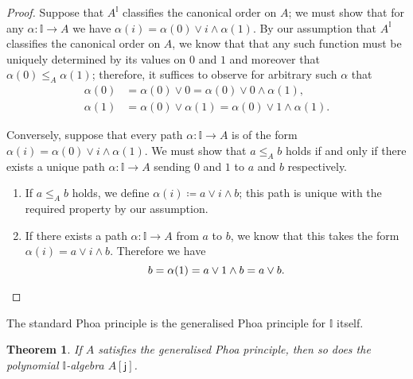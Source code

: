 \documentclass[a4paper,12pt]{amsart}
\newtheorem{theorem}{Theorem}[section]
\theoremstyle{definition}
\newcommand{\mbb}[1]{\mathbb{#1}}
\newcommand{\I}{\mbb I}
\newcommand{\ms}[1]{\mathsf{#1}}
\begin{document}
\begin{proof}
  Suppose that $A^\I$ classifies the canonical order on $A$; we must show that for any $\alpha\colon \I\to A$ we have $\alpha(i) = \alpha(0)\vee i \wedge \alpha(1)$. By our assumption that $A^\I$ classifies the canonical order on $A$, we know that that any such function must be uniquely determined by its values on $0$ and $1$ and moreover that $\alpha(0) \le_A \alpha(1)$; therefore, it suffices to observe for arbitrary such $\alpha$ that
  \begin{align*}
    \alpha(0) &= \alpha(0) \vee 0 = \alpha(0)\vee 0 \wedge \alpha(1)\text{,}\\
    \alpha(1) &= \alpha(0)\vee\alpha(1) = \alpha(0)\vee 1 \wedge \alpha(1)\text{.}
  \end{align*}

  Conversely, suppose that every path $\alpha\colon \I\to A$ is of the form $\alpha(i) = \alpha(0)\vee i \wedge \alpha(1)$. We must show that $a\le_A b$ holds if and only if there exists a unique path $\alpha\colon \I\to A$ sending $0$ and $1$ to $a$ and $b$ respectively.
  \begin{enumerate}
    \item If $a\le_A b$ holds, we define $\alpha(i) \coloneq a\vee i \wedge b$; this path is unique with the required property by our assumption. 
    \item If there exists a path $\alpha\colon\I\to A$ from $a$ to $b$, we know that this takes the form $\alpha(i) = a \vee i \wedge b$. Therefore we have
    \[ 
      b = \alpha(1) = a\vee 1\wedge b = a \vee b.
      \qedhere
    \] 
  \end{enumerate}
\end{proof}

The standard Phoa principle is the generalised Phoa principle for $\I$ itself.

\begin{theorem}\label{thm:gen-phoa-poly}
  If $A$ satisfies the generalised Phoa principle, then so does the polynomial $\I$-algebra $A[\ms{j}]$.
\end{theorem}
\end{document}
